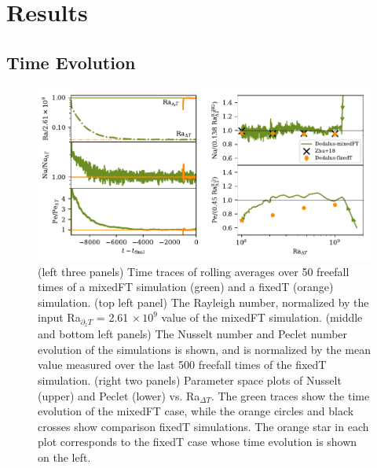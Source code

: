 \documentclass[aps, pre, onecolumn, nofootinbib, notitlepage, groupedaddress, amsfonts, amssymb, amsmath, longbibliography]{revtex4-1}
\begin{document}
\section{Results}
\label{sec:results}

\subsection{Time Evolution}
\label{sec:2d_results}

\begin{figure}
\includegraphics[width=\textwidth]{./figs/rbc_scalar_comparisons.pdf}
\caption{ 
	(left three panels) Time traces of rolling averages over 50 freefall times of a mixedFT simulation (green) and a fixedT (orange) simulation.
	(top left panel) The Rayleigh number, normalized by the input Ra$_{\partial_z T}$ = 2.61$\,\times 10^9$ value of the mixedFT simulation.
	(middle and bottom left panels) The Nusselt number and Peclet number evolution of the simulations is shown, and is normalized by the mean value measured over the last 500 freefall times of the fixedT simulation.
	(right two panels) Parameter space plots of Nusselt (upper) and Peclet (lower) vs. Ra$_{\Delta T}$.
	The green traces show the time evolution of the mixedFT case, while the orange circles and black crosses show comparison fixedT simulations.
	The orange star in each plot corresponds to the fixedT case whose time evolution is shown on the left.
\label{fig:rbc_scalar_comparisons} }
\end{figure}
\end{document}
